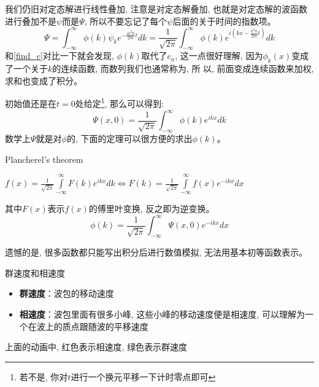 \documentclass[a4paper,zihao=-4,linespread=1]{ctexrep}
\newenvironment{lequation}{\large\begin{equation}}{\end{equation}}
\begin{document}
    我们仍旧对定态解进行线性叠加, 注意是对定态解叠加, 也就是对定态解的波函数进行叠加不是$\psi$而是$\Psi$, 所以不要忘记了每个$\psi$后面的关于时间的指数项。
    \begin{lequation}
        \label{2.26}
        \boxed{
            \Psi=\int_{-\infty}^{\infty}\phi(k)\psi_ke^{-\frac{ik^2\hbar}{2m}t}dk=\frac{1}{\sqrt{2\pi}}\int_{-\infty}^{\infty}\phi(k)e^{i\left(kx-\frac{k^2\hbar}{2m}t\right)}dk  
        }
    \end{lequation}
    和\ref{find_c}对比一下就会发现, $\phi(k)$取代了$c_n$, 这一点很好理解, 因为$\phi_k(x)$变成了一个关于$k$的连续函数, 而数列我们也通常称为, 所
    以, 前面变成连续函数来加权, 求和也变成了积分。

    初始值还是在$t=0$处给定\footnote[3]{若不是, 你对$t$进行一个换元平移一下计时零点即可}, 那么可以得到:
    \begin{lequation}
        \Psi(x,0)=\frac{1}{\sqrt{2\pi}}\int_{-\infty}^{\infty}\phi(k)e^{ikx}dk  
    \end{lequation}
    数学上$\Psi$就是对$\phi$的, 下面的定理可以很方便的求出$\phi(k)$。
    \begin{theorem}{Plancherel's theorem}
        \begin{center}
            \begin{math}
                \displaystyle
                f(x)=\frac{1}{\sqrt{2\pi}} \int\limits_{-\infty}^{\infty}F(k)e^{ikx}dk\Longleftrightarrow F(k)=\frac{1}{\sqrt{2\pi}} \int\limits_{-\infty}^{\infty}f(x)e^{-ikx}dx
            \end{math}
        \end{center}
    \end{theorem}

    其中$F(x)$表示$f(x)$的傅里叶变换, 反之即为逆变换。
    \begin{lequation}
        \boxed{
            \phi(k)=\frac{1}{\sqrt{2\pi}} \int _{-\infty}^{\infty}\Psi(x,0)e^{-ikx}dx
        }
    \end{lequation}
    
    遗憾的是, 很多函数都只能写出积分后进行数值模拟, 无法用基本初等函数表示。
    \begin{define}{群速度和相速度}
        \begin{itemize}
            \item \textbf{群速度}：波包的移动速度
            \item \textbf{相速度}：波包里面有很多小峰, 这些小峰的移动速度便是相速度, 可以理解为一个在波上的质点跟随波的平移速度
        \end{itemize}
    \end{define}
    \begin{center}
        上面的动画中, {\color{red}红色}表示相速度, {\color{green}绿色}表示群速度
    \end{center}
    
\end{document}
